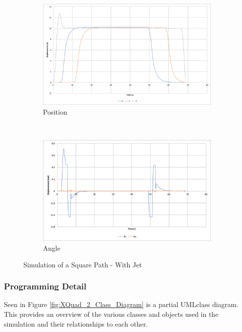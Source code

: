 \documentclass[11pt]{article}
\begin{document}
\begin{figure}
    \begin{subfigure}{\textwidth}
        \includegraphics[width=\linewidth]{square_path_w_jet}
        \caption{Position}
        \label{fig:square_path_w_jet}
    \end{subfigure}\hspace*{\fill}
    \\
    \begin{subfigure}{\textwidth}
        \includegraphics[width=\linewidth]{square_path_w_jet_angle}
        \caption{Angle}
        \label{fig:square_path_w_jet_angle}
    \end{subfigure}

    \caption{Simulation of a Square Path - With Jet}
    \label{fig:Square Path Jet}
\end{figure}

\subsubsection{Programming Detail}
Seen in Figure \ref{fig:XQuad_2_Class_Diagram}
is a partial UML\footnotemark class diagram. This provides an overview of the various classes and objects used in the simulation and their relationships to each other.
\end{document}
